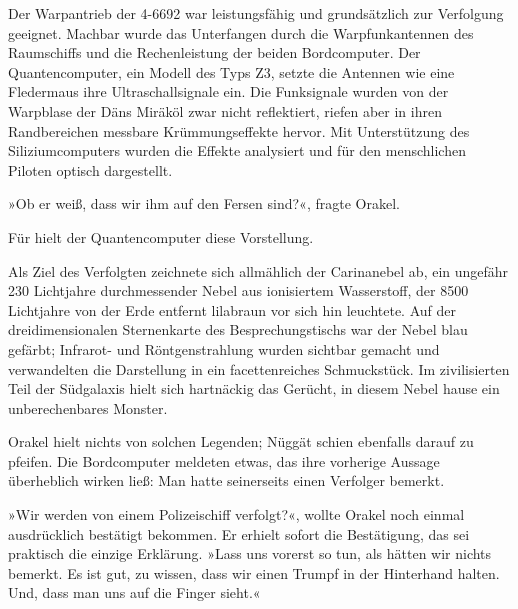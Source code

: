 Der Warpantrieb der 4-6692 war leistungsfähig und grundsätzlich zur Verfolgung geeignet. Machbar wurde das Unterfangen durch die Warpfunkantennen des Raumschiffs und die Rechenleistung der beiden Bordcomputer. Der Quantencomputer, ein Modell des Typs Z3, setzte die Antennen wie eine Fledermaus ihre Ultraschallsignale ein. Die Funksignale wurden von der Warpblase der Däns Miräköl zwar nicht reflektiert, riefen aber in ihren Randbereichen messbare Krümmungseffekte hervor. Mit Unterstützung des Siliziumcomputers wurden die Effekte analysiert und für den menschlichen Piloten optisch dargestellt.

»Ob er weiß, dass wir ihm auf den Fersen sind?«, fragte Orakel.

Für  hielt der Quantencomputer diese Vorstellung. 

Als Ziel des Verfolgten zeichnete sich allmählich der Carinanebel ab, ein ungefähr 230 Lichtjahre durchmessender Nebel aus ionisiertem Wasserstoff, der 8500 Lichtjahre von der Erde entfernt lilabraun vor sich hin leuchtete. Auf der dreidimensionalen Sternenkarte des Besprechungstischs war der Nebel blau gefärbt; Infrarot- und Röntgenstrahlung wurden sichtbar gemacht und verwandelten die Darstellung in ein facettenreiches Schmuckstück. Im zivilisierten Teil der Südgalaxis hielt sich hartnäckig das Gerücht, in diesem Nebel hause ein unberechenbares Monster.

Orakel hielt nichts von solchen Legenden; Nüggät schien ebenfalls darauf zu pfeifen. Die Bordcomputer meldeten etwas, das ihre vorherige Aussage überheblich wirken ließ: Man hatte seinerseits einen Verfolger bemerkt.


»Wir werden von einem Polizeischiff verfolgt?«, wollte Orakel noch einmal ausdrücklich bestätigt bekommen. Er erhielt sofort die Bestätigung, das sei praktisch die einzige Erklärung. »Lass uns vorerst so tun, als hätten wir nichts bemerkt. Es ist gut, zu wissen, dass wir einen Trumpf in der Hinterhand halten. Und, dass man uns auf die Finger sieht.«








